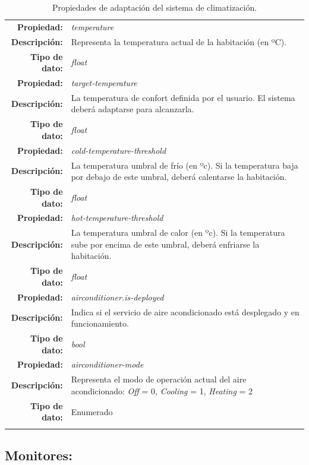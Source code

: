 \begin{longtable}{|r p{11.5cm}|}
    \hline
    \textbf{Propiedad:} & \emph{temperature}  \\
    \textbf{Descripción:} & Representa la temperatura actual de la habitación (en ºC).  \\
    \textbf{Tipo de dato:} & \emph{float} \\
    \hline
    \textbf{Propiedad:} & \emph{target-temperature}  \\
    \textbf{Descripción:} & La temperatura de confort definida por el usuario. El sistema deberá adaptarse para alcanzarla.  \\
    \textbf{Tipo de dato:} & \emph{float} \\
    \hline
    \textbf{Propiedad:} & \emph{cold-temperature-threshold}  \\
    \textbf{Descripción:} & La temperatura umbral de frío (en ºc). Si la temperatura baja por debajo de este umbral, deberá calentarse la habitación. \\
    \textbf{Tipo de dato:} & \emph{float} \\
    \hline
    \textbf{Propiedad:} & \emph{hot-temperature-threshold}  \\
    \textbf{Descripción:} & La temperatura umbral de calor (en ºc). Si la temperatura sube por encima de este umbral, deberá enfriarse la habitación. \\
    \textbf{Tipo de dato:} & \emph{float} \\
    \hline
    \textbf{Propiedad:} & \emph{airconditioner.is-deployed}  \\
    \textbf{Descripción:} & Indica si el servicio de aire acondicionado está desplegado y en funcionamiento.  \\
    \textbf{Tipo de dato:} & \emph{bool} \\
    \hline
    \textbf{Propiedad:} & \emph{airconditioner-mode}  \\
    \textbf{Descripción:} & Representa el modo de operación actual del aire acondicionado: \emph{Off} = 0, \emph{Cooling} = 1, \emph{Heating} = 2  \\
    \textbf{Tipo de dato:} & Enumerado \\
    \hline

  \caption{Propiedades de adaptación del sistema de climatización.}
  \label{tab:climatisation-adaption-properties}
\end{longtable}

\subsection{Monitores:}

